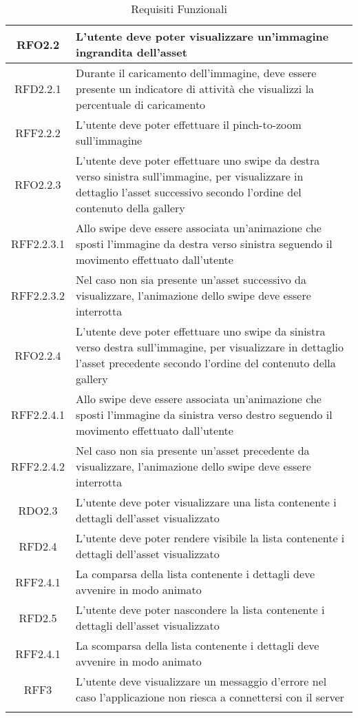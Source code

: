 \begin{longtable}{|c|m{10cm}|}
RFO2.2 & L'utente deve poter visualizzare un'immagine ingrandita dell'asset \\ \hline
RFD2.2.1 & Durante il caricamento dell'immagine, deve essere presente un indicatore di attività che visualizzi la percentuale di caricamento \\ \hline
RFF2.2.2 & L'utente deve poter effettuare il pinch-to-zoom sull'immagine \\ \hline
RFO2.2.3 & L'utente deve poter effettuare uno swipe da destra verso sinistra sull'immagine, per visualizzare in dettaglio l'asset successivo secondo l'ordine del contenuto della gallery \\ \hline
RFF2.2.3.1 & Allo swipe deve essere associata un'animazione che sposti l'immagine da destra verso sinistra seguendo il movimento effettuato dall'utente \\ \hline
RFF2.2.3.2 & Nel caso non sia presente un'asset successivo da visualizzare, l'animazione dello swipe deve essere interrotta \\ \hline
RFO2.2.4 & L'utente deve poter effettuare uno swipe da sinistra verso destra sull'immagine, per visualizzare in dettaglio l'asset precedente secondo l'ordine del contenuto della gallery \\ \hline
RFF2.2.4.1 & Allo swipe deve essere associata un'animazione che sposti l'immagine da sinistra verso destro seguendo il movimento effettuato dall'utente \\ \hline
RFF2.2.4.2 & Nel caso non sia presente un'asset precedente da visualizzare, l'animazione dello swipe deve essere interrotta \\ \hline
RDO2.3 & L'utente deve poter visualizzare una lista contenente i dettagli dell'asset visualizzato \\ \hline
RFD2.4 & L'utente deve poter rendere visibile la lista contenente i dettagli dell'asset visualizzato \\ \hline
RFF2.4.1 & La comparsa della lista contenente i dettagli deve avvenire in modo animato \\ \hline
RFD2.5 & L'utente deve poter nascondere la lista contenente i dettagli dell'asset visualizzato \\ \hline
RFF2.4.1 & La scomparsa della lista contenente i dettagli deve avvenire in modo animato \\ \hline
RFF3 & L'utente deve visualizzare un messaggio d'errore nel caso l'applicazione non riesca a connettersi con il server \\ \hline
\caption[Requisiti Funzionali]{Requisiti Funzionali}
\label{tabella:req0}
\end{longtable}


